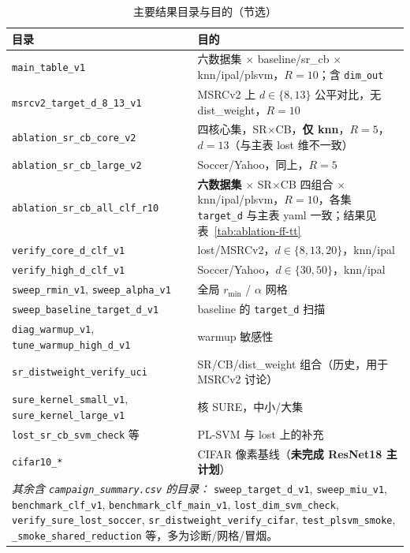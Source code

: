\documentclass[11pt,a4paper]{article}
\begin{document}
\begin{table}[htbp]
\centering
\caption{主要结果目录与目的（节选）}
\label{tab:campaigns}
\small
\begin{tabular}{p{4.2cm}p{9.5cm}}
\toprule
目录 & 目的 \\
\midrule
\texttt{main\_table\_v1} & 六数据集 $\times$ baseline/sr\_cb $\times$ knn/ipal/plsvm，$R{=}10$；含 \texttt{dim\_out} \\
\texttt{msrcv2\_target\_d\_8\_13\_v1} & MSRCv2 上 $d\in\{8,13\}$ 公平对比，无 dist\_weight，$R{=}10$ \\
\texttt{ablation\_sr\_cb\_core\_v2} & 四核心集，SR$\times$CB，\textbf{仅 knn}，$R{=}5$，$d{=}13$（与主表 lost 维不一致） \\
\texttt{ablation\_sr\_cb\_large\_v2} & Soccer/Yahoo，同上，$R{=}5$ \\
\texttt{ablation\_sr\_cb\_all\_clf\_r10} & \textbf{六数据集} $\times$ SR$\times$CB 四组合 $\times$ knn/ipal/plsvm，$R{=}10$，各集 \texttt{target\_d} 与主表 yaml 一致；结果见表~\ref{tab:ablation-ff-tt} \\
\texttt{verify\_core\_d\_clf\_v1} & lost/MSRCv2，$d\in\{8,13,20\}$，knn/ipal \\
\texttt{verify\_high\_d\_clf\_v1} & Soccer/Yahoo，$d\in\{30,50\}$，knn/ipal \\
\texttt{sweep\_rmin\_v1}, \texttt{sweep\_alpha\_v1} & 全局 $r_{\min}$ / $\alpha$ 网格 \\
\texttt{sweep\_baseline\_target\_d\_v1} & baseline 的 \texttt{target\_d} 扫描 \\
\texttt{diag\_warmup\_v1}, \texttt{tune\_warmup\_high\_d\_v1} & warmup 敏感性 \\
\texttt{sr\_distweight\_verify\_uci} & SR/CB/dist\_weight 组合（历史，用于 MSRCv2 讨论） \\
\texttt{sure\_kernel\_small\_v1}, \texttt{sure\_kernel\_large\_v1} & 核 SURE，中小/大集 \\
\texttt{lost\_sr\_cb\_svm\_check} 等 & PL-SVM 与 lost 上的补充 \\
\texttt{cifar10\_*} & CIFAR 像素基线（\textbf{未完成 ResNet18 主计划}） \\
\midrule
\multicolumn{2}{l}{\emph{其余含 \texttt{campaign\_summary.csv} 的目录：}
\texttt{sweep\_target\_d\_v1}, \texttt{sweep\_miu\_v1},
\texttt{benchmark\_clf\_v1}, \texttt{benchmark\_clf\_main\_v1},
\texttt{lost\_dim\_svm\_check}, \texttt{verify\_sure\_lost\_soccer},
\texttt{sr\_distweight\_verify\_cifar}, \texttt{test\_plsvm\_smoke},
\texttt{\_smoke\_shared\_reduction} 等，多为诊断/网格/冒烟。} \\
\bottomrule
\end{tabular}
\end{table}
\end{document}
